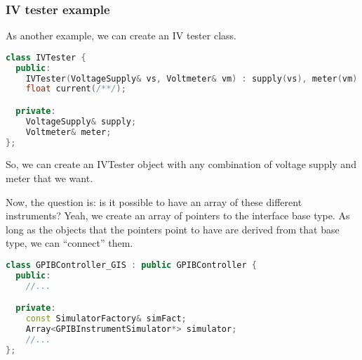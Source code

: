 \subsubsection{IV tester example}

As another example, we can create an IV tester class.

\begin{lstlisting}[language=C++]
class IVTester {
  public:
    IVTester(VoltageSupply& vs, Voltmeter& vm) : supply(vs), meter(vm) { }
    float current(/**/);

  private:
    VoltageSupply& supply;
    Voltmeter& meter;
};
\end{lstlisting}

So, we can create an IVTester object with any combination of voltage supply and meter that we want. 

Now, the question is: is it possible to have an array of these different instruments? Yeah, we create an array of pointers to the interface base type. As long as the objects that the pointers point to have are derived from that base type, we can ``connect'' them. 

\begin{lstlisting}[language=C++]
class GPIBController_GIS : public GPIBController {
  public:
    //...

  private:
    const SimulatorFactory& simFact;
    Array<GPIBInstrumentSimulator*> simulator;
    //...
};
\end{lstlisting}